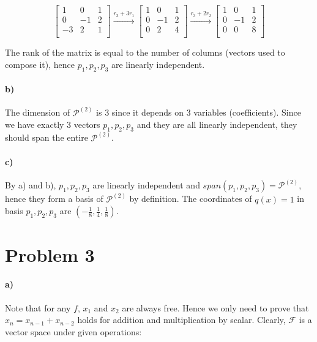 \documentclass[10pt,letter]{article}
\begin{document}
\[
\left[ {\begin{array}{ccc}
 1 & 0 & 1 \\
 0 & -1 & 2 \\
 -3 & 2 & 1 \\
\end{array} } \right]
\xrightarrow{r_{3}+3r_1}
\left[ {\begin{array}{ccc}
 1 & 0 & 1 \\
 0 & -1 & 2 \\
 0 & 2 & 4 \\
\end{array} } \right]
\xrightarrow{r_{3}+2r_2}
\left[ {\begin{array}{ccc}
 1 & 0 & 1 \\
 0 & -1 & 2 \\
 0 & 0 & 8 \\
\end{array} } \right]
\]

The rank of the matrix is equal to the number of columns (vectors used to compose it), hence $p_1, p_2, p_3$ are linearly independent.

\paragraph{b)} The dimension of $\mathcal{P}^{(2)}$ is 3 since it depends on 3 variables (coefficients). Since we have exactly 3 vectors $p_1, p_2, p_3$ and they are all linearly independent, they should span the entire $\mathcal{P}^{(2)}$.

\paragraph{c)} By a) and b), $p_1, p_2, p_3$ are linearly independent and $span(p_1, p_2, p_3) = \mathcal{P}^{(2)}$, hence they form a basis of $\mathcal{P}^{(2)}$ by definition. The coordinates of $q(x) = 1$ in basis $p_1, p_2, p_3$ are $(-\frac{1}{8}, \frac{1}{4}, \frac{1}{8})$. 

\pagebreak

\section*{Problem 3}

\paragraph{a)} Note that for any $f$, $x_1$ and $x_2$ are always free. Hence we only need to prove that $x_n = x_{n-1} + x_{n-2}$ holds for addition and multiplication by scalar. Clearly, $\mathcal{F}$ is a vector space under given operations:
\end{document}
